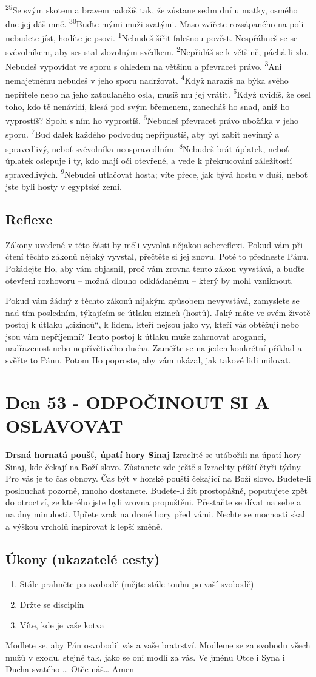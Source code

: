 \documentclass[11pt]{article}
\newcommand{\zacatekOsmyTyden}{
  \textbf{Drsná hornatá poušť, úpatí hory Sinaj} \newline 
  Izraelité se utábořili na úpatí hory Sinaj, kde čekají na Boží slovo. Zůstanete zde ještě s Izraelity příští čtyři týdny. Pro vás je to čas obnovy. Čas být v horské poušti čekající na Boží slovo. Budete-li poslouchat pozorně, mnoho dostanete. Budete-li žít prostopášně, poputujete zpět do otroctví, ze kterého jste byli zrovna propuštěni. Přestaňte se dívat na sebe a na dny minulosti. Upřete zrak na drsné hory před vámi. Nechte se mocností skal a výškou vrcholů inspirovat k lepší změně.
  \subsection*{Úkony (ukazatelé cesty)}
\begin{enumerate}
  \item Stále prahněte po svobodě (mějte stále touhu po vaší svobodě)
  \item Držte se disciplín
  \item Víte, kde je vaše kotva
\end{enumerate}
Modlete se, aby Pán osvobodil vás a vaše bratrství. \newline
Modleme se za svobodu všech mužů v exodu, stejně tak, jako se oni modlí za vás.\newline
Ve jménu Otce i Syna i Ducha svatého …  Otče náš… Amen
}
\begin{document}
{\textsuperscript{29}Se svým skotem a bravem naložíš tak, že zůstane sedm dní u matky, osmého dne jej dáš mně.
\textsuperscript{30}Buďte mými muži svatými. Maso zvířete rozsápaného na poli nebudete jíst, hodíte je psovi.
\textsuperscript{1}Nebudeš šířit falešnou pověst. Nespřáhneš se se svévolníkem, aby ses stal zlovolným svědkem.
\textsuperscript{2}Nepřidáš se k většině, páchá-li zlo. Nebudeš vypovídat ve sporu s ohledem na většinu a převracet právo. 
\textsuperscript{3}Ani nemajetnému nebudeš v jeho sporu nadržovat.
\textsuperscript{4}Když narazíš na býka svého nepřítele nebo na jeho zatoulaného osla, musíš mu jej vrátit.
\textsuperscript{5}Když uvidíš, že osel toho, kdo tě nenávidí, klesá pod svým břemenem, zanecháš ho snad, aniž ho vyprostíš? Spolu s ním ho vyprostíš.
\textsuperscript{6}Nebudeš převracet právo ubožáka v jeho sporu.
\textsuperscript{7}Buď dalek každého podvodu; nepřipustíš, aby byl zabit nevinný a spravedlivý, neboť svévolníka neospravedlním.
\textsuperscript{8}Nebudeš brát úplatek, neboť úplatek oslepuje i ty, kdo mají oči otevřené, a vede k překrucování záležitostí spravedlivých.
\textsuperscript{9}Nebudeš utlačovat hosta; víte přece, jak bývá hostu v duši, neboť jste byli hosty v egyptské zemi.
}

\subsection*{Reflexe}
Zákony uvedené v této části by měli vyvolat nějakou sebereflexi. Pokud vám při čtení těchto zákonů nějaký
vyvstal, přečtěte si jej znovu. Poté to předneste Pánu. Požádejte Ho, aby vám objasnil, proč vám zrovna tento
zákon vyvstává, a buďte otevřeni rozhovoru – možná dlouho odkládanému – který by mohl vzniknout.

Pokud vám žádný z těchto zákonů nijakým způsobem nevyvstává, zamyslete se nad tím posledním, týkajícím
se útlaku cizinců (hostů). Jaký máte ve svém životě postoj k útlaku „cizinců“, k lidem, kteří nejsou jako vy,
kteří vás obtěžují nebo jsou vám nepříjemní? Tento postoj k útlaku může zahrnovat aroganci, nadřazenost
nebo nepřívětivého ducha. Zaměřte se na jeden konkrétní příklad a svěřte to Pánu. Potom Ho poproste, aby
vám ukázal, jak takové lidi milovat.

\newpage
\section{Den 53 - ODPOČINOUT SI A OSLAVOVAT}
\zacatekOsmyTyden
\end{document}
